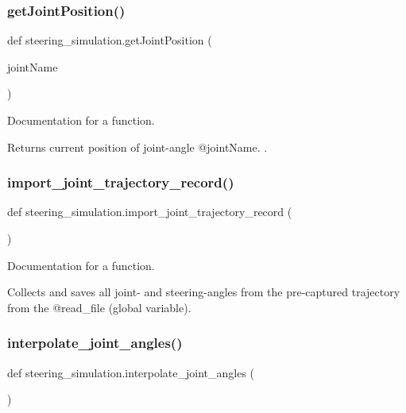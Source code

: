 \subsubsection{\texorpdfstring{getJointPosition()}{getJointPosition()}}
{\footnotesize\ttfamily def steering\+\_\+simulation.\+get\+Joint\+Position (\begin{DoxyParamCaption}\item[{}]{joint\+Name }\end{DoxyParamCaption})}



Documentation for a function. 

Returns current position of joint-\/angle @joint\+Name. . \mbox{\label{namespacesteering__simulation_a628f6027d970db8d4071e5846de522fc}} 
\subsubsection{\texorpdfstring{import\_joint\_trajectory\_record()}{import\_joint\_trajectory\_record()}}
{\footnotesize\ttfamily def steering\+\_\+simulation.\+import\+\_\+joint\+\_\+trajectory\+\_\+record (\begin{DoxyParamCaption}{ }\end{DoxyParamCaption})}



Documentation for a function. 

Collects and saves all joint-\/ and steering-\/angles from the pre-\/captured trajectory from the @read\+\_\+file (global variable). \mbox{\label{namespacesteering__simulation_a6e3b1fe25edfbec1713a6bd3ef2a445e}} 
\subsubsection{\texorpdfstring{interpolate\_joint\_angles()}{interpolate\_joint\_angles()}}
{\footnotesize\ttfamily def steering\+\_\+simulation.\+interpolate\+\_\+joint\+\_\+angles (\begin{DoxyParamCaption}{ }\end{DoxyParamCaption})}



